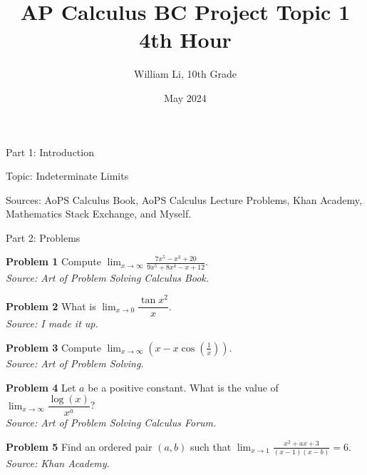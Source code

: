 \documentclass{article}
\title{AP Calculus BC Project Topic 1 4th Hour}
\author{William Li, 10th Grade}
\date{May 2024}
\begin{document}
\maketitle

\LARGE Part 1: Introduction

\hspace{1cm}

\Large Topic: Indeterminate Limits

Sources: AoPS Calculus Book, AoPS Calculus Lecture Problems, Khan Academy, Mathematics Stack Exchange, and Myself.



\newpage

\begin{comment}
	Indeterminate Limits Problems
\end{comment}

\LARGE Part 2: Problems

\vspace{2cm}

\large

\textbf{Problem 1} Compute $\displaystyle \lim_{x \rightarrow \infty} \frac{7x^5 - x^3 + 20}{9x^5+8x^4-x+12}$.\\
\textit{Source: Art of Problem Solving Calculus Book.}

\vspace{1cm}

\textbf{Problem 2} What is $\displaystyle \lim_{x \to 0} \dfrac {\tan{x^2}} {x}$.\\
\textit{Source: I made it up.}

\vspace{1cm}

\textbf{Problem 3} Compute $\displaystyle \lim_{x \rightarrow \infty} \left( x - x \cos \left( \frac{1}{x} \right) \right).$\\
\textit{Source: Art of Problem Solving.}

\vspace{1cm}

\textbf{Problem 4}  Let $a$ be a positive constant. What is the value of $\displaystyle \lim_{x\to\infty} \dfrac{\log(x)}{x^a}$?\\
\textit{Source: Art of Problem Solving Calculus Forum.}

\vspace{1cm}

\textbf{Problem 5} Find an ordered pair $(a,b)$ such that $\displaystyle \lim_{x\to 1}\frac{x^2+ax+3}{(x-1)(x-b)}=6$.\\
\textit{Source: Khan Academy.}
\end{document}
